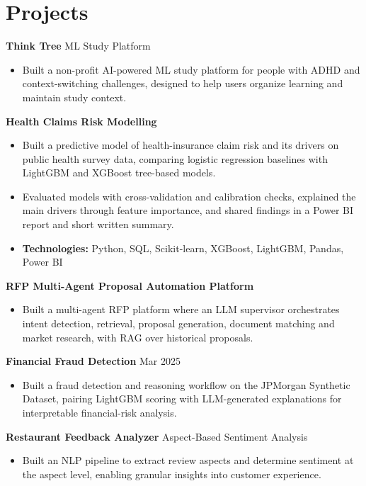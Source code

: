 \documentclass[10pt,a4paper]{article}
\begin{document}
\section{Projects}
\textbf{Think Tree} \textbar{} ML Study Platform\par
\begin{itemize}
  \item Built a non-profit AI-powered ML study platform for people with ADHD and context-switching challenges, designed to help users organize learning and maintain study context.
\end{itemize}
\textbf{Health Claims Risk Modelling}\par
\begin{itemize}
  \item Built a predictive model of health-insurance claim risk and its drivers on public health survey data, comparing logistic regression baselines with LightGBM and XGBoost tree-based models.
  \item Evaluated models with cross-validation and calibration checks, explained the main drivers through feature importance, and shared findings in a Power BI report and short written summary.
  \item \textbf{Technologies:} Python, SQL, Scikit-learn, XGBoost, LightGBM, Pandas, Power BI
\end{itemize}
\textbf{RFP Multi-Agent Proposal Automation Platform}\par
\begin{itemize}
  \item Built a multi-agent RFP platform where an LLM supervisor orchestrates intent detection, retrieval, proposal generation, document matching and market research, with RAG over historical proposals.
\end{itemize}
\textbf{Financial Fraud Detection} \textbar{} Mar 2025\par
\begin{itemize}
  \item Built a fraud detection and reasoning workflow on the JPMorgan Synthetic Dataset, pairing LightGBM scoring with LLM-generated explanations for interpretable financial-risk analysis.
\end{itemize}
\textbf{Restaurant Feedback Analyzer} \textbar{} Aspect-Based Sentiment Analysis\par
\begin{itemize}
  \item Built an NLP pipeline to extract review aspects and determine sentiment at the aspect level, enabling granular insights into customer experience.
\end{itemize}
\end{document}
